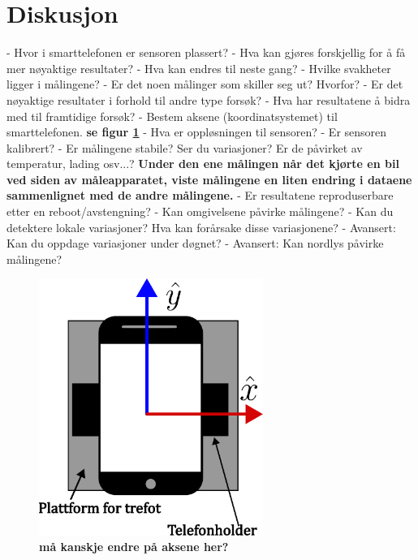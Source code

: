 \section{Diskusjon}

- Hvor i smarttelefonen er sensoren plassert? \newline 
- Hva kan gjøres forskjellig for å få mer nøyaktige resultater? - Hva kan endres til neste gang? \newline
- Hvilke svakheter ligger i målingene? \newline
- Er det noen målinger som skiller seg ut? Hvorfor? \newline
- Er det nøyaktige resultater i forhold til andre type forsøk? \newline
- Hva har resultatene å bidra med til framtidige forsøk? \newline 
- Bestem aksene (koordinatsystemet) til smarttelefonen. \textbf{se figur \ref{fig:telf_akser} }\newline 
- Hva er oppløsningen til sensoren? \newline
- Er sensoren kalibrert? \newline
- Er målingene stabile? Ser du variasjoner? Er de påvirket av temperatur, lading
osv...? \textbf{Under den ene målingen når det kjørte en bil ved siden av måleapparatet, viste målingene en liten endring i dataene sammenlignet med de andre målingene. }\newline
- Er resultatene reproduserbare etter en reboot/avstengning? \newline
- Kan omgivelsene påvirke målingene? \newline                      
- Kan du detektere lokale variasjoner? Hva kan forårsake disse variasjonene?  \newline
- Avansert: Kan du oppdage variasjoner under døgnet? \newline
- Avansert: Kan nordlys påvirke målingene? \newline


\begin{figure}
    \centering
    \includegraphics[width=0.65\textwidth]{img/Plattform med telefoni.pdf}
    \caption{\textbf{må kanskje endre på aksene her?} 
        }
    \label{fig:telf_akser}
\end{figure}